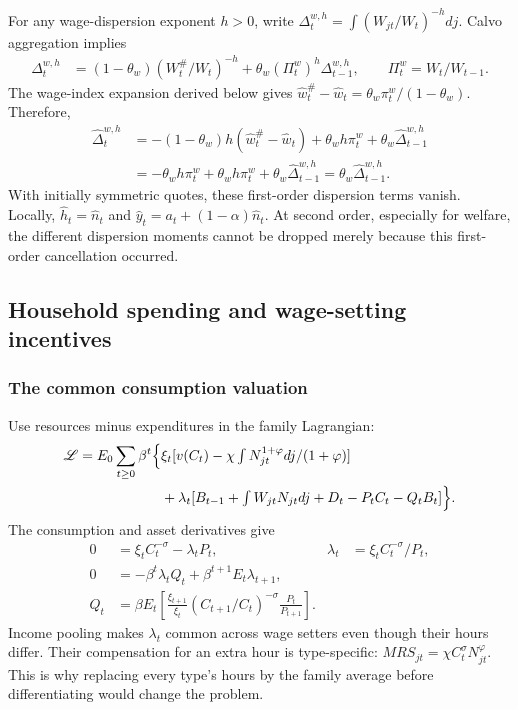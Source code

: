 For any wage-dispersion exponent $h>0$, write
$\Delta_t^{w,h}=\int(W_{jt}/W_t)^{-h}dj$. Calvo aggregation implies
\begin{align}
 \Delta_t^{w,h}
 &=(1-\theta_w)(W_t^{\#}/W_t)^{-h}
                  +\theta_w(\Pi_t^w)^h\Delta_{t-1}^{w,h},
 \qquad\Pi_t^w=W_t/W_{t-1}.
\end{align}
The wage-index expansion derived below gives
$\hat w_t^{\#}-\hat w_t=\theta_w\pi_t^w/(1-\theta_w)$. Therefore,
\begin{align}
 \hat\Delta_t^{w,h}
 &=-(1-\theta_w)h(\hat w_t^{\#}-\hat w_t)
             +\theta_wh\pi_t^w+\theta_w\hat\Delta_{t-1}^{w,h}\\
 &=-\theta_wh\pi_t^w+\theta_wh\pi_t^w+\theta_w\hat\Delta_{t-1}^{w,h}
 =\theta_w\hat\Delta_{t-1}^{w,h}.
\end{align}
With initially symmetric quotes, these first-order dispersion terms vanish.
Locally, $\hat h_t=\hat n_t$ and
$\hat y_t=a_t+(1-\alpha)\hat n_t$. At second order, especially for welfare,
the different dispersion moments cannot be dropped merely because this
first-order cancellation occurred.

\subsection{Household spending and wage-setting incentives}

\subsubsection{The common consumption valuation}

Use resources minus expenditures in the family Lagrangian:
\begin{align}
 \mathcal L=E_0\sum_{t\geq0}\beta^t\Big\{&\xi_t
  [v(C_t)-\chi\textstyle\int N_{jt}^{1+\varphi}dj/(1+\varphi)]\notag\\
 &+\lambda_t[B_{t-1}+\textstyle\int W_{jt}N_{jt}dj+D_t
                                      -P_tC_t-Q_tB_t]\Big\}.
\end{align}
The consumption and asset derivatives give
\begin{align}
 0&=\xi_tC_t^{-\sigma}-\lambda_tP_t,
 &\lambda_t&=\xi_tC_t^{-\sigma}/P_t,\\
 0&=-\beta^t\lambda_tQ_t+\beta^{t+1}E_t\lambda_{t+1},\\
 Q_t&=\beta E_t\left[\frac{\xi_{t+1}}{\xi_t}
             (C_{t+1}/C_t)^{-\sigma}\frac{P_t}{P_{t+1}}\right].
 \label{eq:sw-euler}
\end{align}
Income pooling makes $\lambda_t$ common across wage setters even though their
hours differ. Their compensation for an extra hour is type-specific:
$MRS_{jt}=\chi C_t^\sigma N_{jt}^\varphi$. This is why replacing every type's
hours by the family average before differentiating would change the problem.

